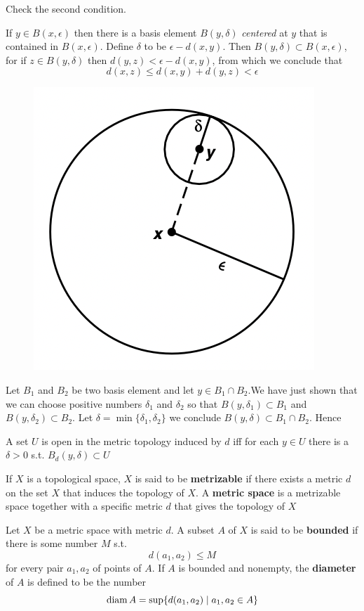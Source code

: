 \documentclass[11pt]{article}
\begin{document}
Check the second condition.

If \(y\in B(x,\epsilon)\) then there is a basis element \(B(y,\delta)\) \emph{centered} at \(y\) that is contained
in \(B(x,\epsilon)\). Define \(\delta\) to be \(\epsilon-d(x,y)\). Then \(B(y,\delta)\subset B(x,\epsilon)\), for if \(z\in B(y,\delta)\)
then \(d(y,z)<\epsilon-d(x,y)\), from which we conclude that
\begin{equation*}
d(x,z)\le d(x,y)+d(y,z)<\epsilon
\end{equation*}

\begin{figure}[htbp]
\centering
\includegraphics[width=.4\textwidth]{../images/Topology/4.png}
\label{}
\end{figure}

Let \(B_1\) and \(B_2\) be two basis element and let \(y\in B_1\cap B_2\).We have just shown that we can
choose positive numbers \(\delta_1\) and \(\delta_2\) so that \(B(y,\delta_1)\subset B_1\) and \(B(y,\delta_2)\subset B_2\).
Let \(\delta=\min\{\delta_1,\delta_2\}\) we conclude \(B(y,\delta)\subset B_1\cap B_2\). Hence
\begin{quoting}
A set \(U\) is open in the metric topology induced by \(d\) iff for each \(y\in U\) there is
a \(\delta>0\) s.t. \(B_d(y,\delta)\subset U\)
\end{quoting}

\begin{definition}[]
If \(X\) is a topological space, \(X\) is said to be \textbf{metrizable} if there exists a metric \(d\) on
the set \(X\) that induces the topology of \(X\).  A \textbf{metric space} is a metrizable space together
with a specific metric \(d\) that gives the topology of \(X\)
\end{definition}

\begin{definition}[]
Let \(X\) be a metric space with metric \(d\). A subset \(A\) of \(X\) is said to be \textbf{bounded} if
there is some number \(M\) s.t.
\begin{equation*}
d(a_1,a_2)\le M
\end{equation*}
for every pair \(a_1,a_2\) of points of \(A\). If \(A\) is bounded and nonempty, the \textbf{diameter}
of \(A\) is defined to be the number
\begin{equation*}
\operatorname{diam} A=\sup\{d(a_1,a_2)\mid a_1,a_2\in A\}
\end{equation*}
\end{definition}
\end{document}
